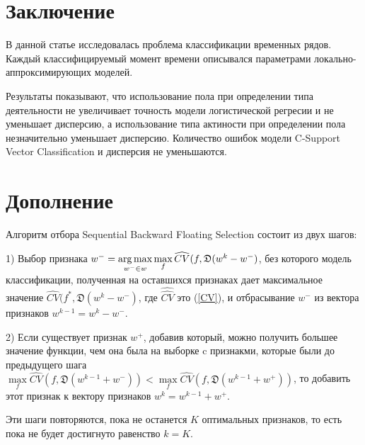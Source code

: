 \documentclass[12pt, twoside]{article}
\begin{document}
\section{ Заключение}

В данной статье исследовалась проблема классификации временных рядов. Каждый классифицируемый момент времени описывался параметрами локально-аппроксимирующих моделей.

Результаты показывают, что использование пола при определении типа деятельности не увеличивает точность модели логистической регресии и не уменьшает дисперсию, а использование типа актиности при определении пола незначительно уменьшает дисперсию. Количество ошибок модели C-Support Vector Classification и дисперсия не уменьшаются.


\section{ Дополнение}
\label{dop}

Алгоритм отбора Sequential Backward Floating Selection состоит из двух шагов:

1) Выбор признака $w^- = \argmax\limits_{w^- \in w} \max\limits_{f}\widehat{CV}(f, \mathfrak{D}(w^k-w^-)$, без которого модель классификации, полученная на оставшихся признаках дает максимальное значение $\widehat{CV}(f^*, \mathfrak{D}(w^k-w^-)$, где $\widehat{\hat{CV}}$ это (\ref{CV}), и отбрасывание $w^-$ из вектора признаков $w^{k-1}=w^k-w^-$.

2) Если существует признак $w^+$, добавив который, можно получить большее значение функции, чем она была на выборке c признакми, которые были до предыдущего шага $\max\limits_f \widehat{CV}(f, \mathfrak{D}(w^{k-1}+w^-))<\max\limits_f \widehat{CV}(f, \mathfrak{D}(w^{k-1}+w^+))$, то добавить этот признак к вектору признаков $w^k = w^{k-1}+w^+$.

Эти шаги повторяются, пока не останется $K$ оптимальных признаков, то есть пока не будет достигнуто равенство $k=K$.
\end{document}
